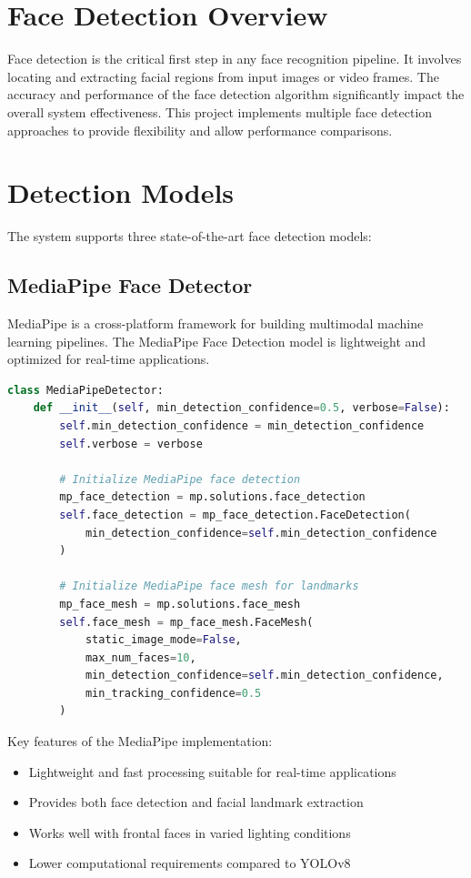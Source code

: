 \section{Face Detection Overview}
Face detection is the critical first step in any face recognition pipeline. It involves locating and extracting facial regions from input images or video frames. The accuracy and performance of the face detection algorithm significantly impact the overall system effectiveness. This project implements multiple face detection approaches to provide flexibility and allow performance comparisons.

\section{Detection Models}
The system supports three state-of-the-art face detection models:

\subsection{MediaPipe Face Detector}
MediaPipe is a cross-platform framework for building multimodal machine learning pipelines. The MediaPipe Face Detection model is lightweight and optimized for real-time applications.

\begin{lstlisting}[language=Python, caption=MediaPipe Detector Implementation]
class MediaPipeDetector:
    def __init__(self, min_detection_confidence=0.5, verbose=False):
        self.min_detection_confidence = min_detection_confidence
        self.verbose = verbose
        
        # Initialize MediaPipe face detection
        mp_face_detection = mp.solutions.face_detection
        self.face_detection = mp_face_detection.FaceDetection(
            min_detection_confidence=self.min_detection_confidence
        )
        
        # Initialize MediaPipe face mesh for landmarks
        mp_face_mesh = mp.solutions.face_mesh
        self.face_mesh = mp_face_mesh.FaceMesh(
            static_image_mode=False,
            max_num_faces=10,
            min_detection_confidence=self.min_detection_confidence,
            min_tracking_confidence=0.5
        )
\end{lstlisting}

Key features of the MediaPipe implementation:
\begin{itemize}
    \item Lightweight and fast processing suitable for real-time applications
    \item Provides both face detection and facial landmark extraction
    \item Works well with frontal faces in varied lighting conditions
    \item Lower computational requirements compared to YOLOv8
\end{itemize}

